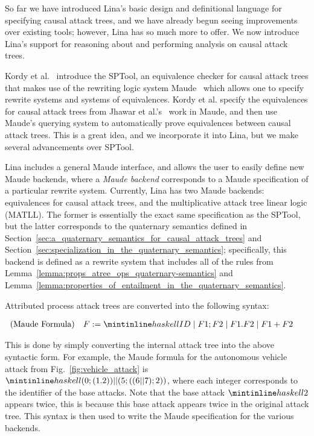 So far we have introduced Lina's basic design and definitional
language for specifying causal attack trees, and we have already begun
seeing improvements over existing tools; however, Lina has so much
more to offer.  We now introduce Lina's support for reasoning about
and performing analysis on causal attack trees.

Kordy et al.~\cite{Kordy2017} introduce the SPTool, an equivalence
checker for causal attack trees that makes use of the rewriting logic
system Maude~\cite{clavel2005maude} which allows one to specify
rewrite systems and systems of equivalences.  Kordy et al. specify the
equivalences for causal attack trees from Jhawar et
al.'s~\cite{Jhawar:2015} work in Maude, and then use Maude's querying
system to automatically prove equivalences between causal attack
trees.  This is a great idea, and we incorporate it into Lina, but we
make several advancements over SPTool.

Lina includes a general Maude interface, and allows the user to easily
define new Maude backends, where a \emph{Maude backend} corresponds to
a Maude specification of a particular rewrite system.  Currently, Lina
has two Maude backends: equivalences for causal attack trees, and the
multiplicative attack tree linear logic (MATLL).  The former is
essentially the exact same specification as the SPTool, but the latter
corresponds to the quaternary semantics defined in
Section~\ref{sec:a_quaternary_semantics_for_causal_attack_trees} and
Section~\ref{sec:specialization_in_the_quaternary_semantics};
specifically, this backend is defined as a rewrite system that
includes all of the rules from
Lemma~\ref{lemma:props_atree_ops_quaternary-semantics} and
Lemma~\ref{lemma:properties_of_entailment_in_the_quaternary_semantics}.

Attributed process attack trees are converted into the following
syntax:
\begin{center}
  \begin{math}
    \begin{array}{lll}
      \text{(Maude Formula)} & F := \mh{ID} \mid F1 ; F2 \mid F1.F2 \mid F1+F2
    \end{array}
  \end{math}
\end{center}
This is done by simply converting the internal attack tree into the
above syntactic form.  For example, the Maude formula for the
autonomous vehicle attack from Fig.~\ref{fig:vehicle_attack} is
$\mh{(0 ; (1 . 2)) || (5 ; ((6 || 7) ; 2))}$, where each integer
corresponds to the identifier of the base attacks.  Note that the base
attack $\mh{2}$ appears twice, this is because this base attack
appears twice in the original attack tree.  This syntax is then used
to write the Maude specification for the various backends.

